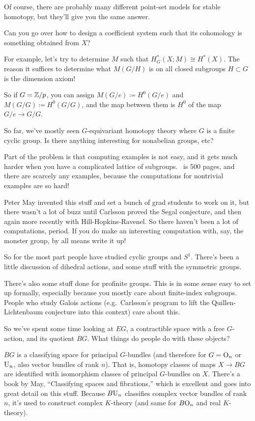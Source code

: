 Of course, there are probably many different point-set models for stable homotopy, but they'll give you the same
answer.
\begin{ques}
Can you go over how to design a coefficient system such that its cohomology is something obtained from $X$?
\end{ques}
For example, let's try to determine $M$ such that $H_G^*(X;M)\cong H^*(X)$. The reason it suffices to determine
what $M(G/H)$ is on all closed subgroups $H\subset G$ is the dimension axiom!

So if $G = \mathbb Z/p$, you can assign $M(G/e) \coloneqq H^0(G/e)$ and $M(G/G) \coloneqq H^0(G/G)$, and the map between
them is $H^0$ of the map $G/e\to G/G$.
\begin{ques}
So far, we've mostly seen $G$-equivariant homotopy theory where $G$ is a finite cyclic group. Is there anything
interesting for nonabelian groups, etc?
\end{ques}
Part of the problem is that computing examples is not easy, and it gets much harder when you have a complicated
lattice of subgroups.~\cite{LMS} is 500 pages, and there are scarcely any examples, because the computations for
nontrivial examples are so hard!

Peter May invented this stuff and set a bunch of grad students to work on it, but there wasn't a lot of buzz until
Carlsson proved the Segal conjecture, and then again more recently with Hill-Hopkins-Ravenel. So there haven't been
a lot of computations, period. If you do make an interesting computation with, say, the monster group, by all means
write it up!

So for the most part people have studied cyclic groups and $S^1$. There's been a little discussion of dihedral
actions, and some stuff with the symmetric groups.

There's also some stuff done for profinite groups. This is in some sense easy to set up formally, especially
because you mostly care about finite-index subgroups. People who study Galois actions (e.g.\ Carlsson's program to
lift the Quillen-Lichtenbaum conjecture into this context) care about this.
\begin{ques}
So we've spent some time looking at $EG$, a contractible space with a free $G$-action, and its quotient $BG$. What
things do people do with these objects?
\end{ques}
$BG$ is a classifying space for principal $G$-bundles (and therefore for $G = \mathrm O_n$ or $\mathrm U_n$, also vector bundles
of rank $n$). That is, homotopy classes of maps $X\to BG$ are identified with isomorphism classes of principal
$G$-bundles on $X$. There's a book by May, ``Classifying spaces and fibrations,'' which is excellent and goes into
great detail on this stuff. Because $B\mathrm U_n$ classifies complex vector bundles of rank $n$, it's used to construct
complex $K$-theory (and same for $B\mathrm O_n$ and real $K$-theory).

